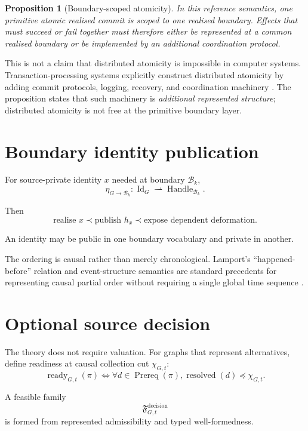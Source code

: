 \documentclass[11pt,a4paper]{article}
\newtheorem{proposition}[theorem]{Proposition}
\theoremstyle{remark}
\begin{document}
\begin{proposition}[Boundary-scoped atomicity]\label{prop:boundary-atomicity}
In this reference semantics, one primitive atomic realised commit is scoped to one realised boundary. Effects that must succeed or fail together must therefore either be represented at a common realised boundary or be implemented by an additional coordination protocol.
\end{proposition}

This is not a claim that distributed atomicity is impossible in computer systems. Transaction-processing systems explicitly construct distributed atomicity by adding commit protocols, logging, recovery, and coordination machinery \citep{gray1993}. The proposition states that such machinery is \emph{additional represented structure}; distributed atomicity is not free at the primitive boundary layer.

\section{Boundary identity publication}\label{sec:publication}

For source-private identity $x$ needed at boundary $\mathcal B_k$,
\[
\eta_{G\rightarrow\mathcal B_k}:
\operatorname{Id}_G
\rightharpoonup
\operatorname{Handle}_{\mathcal B_k}.
\]

Then
\[
\text{realise }x
\prec
\text{publish }h_x
\prec
\text{expose dependent deformation}.
\]

An identity may be public in one boundary vocabulary and private in another.

The ordering is causal rather than merely chronological. Lamport's ``happened-before'' relation and event-structure semantics are standard precedents for representing causal partial order without requiring a single global time sequence \citep{lamport1978,winskel1987}.

\section{Optional source decision}\label{sec:decision}

The theory does not require valuation. For graphs that represent alternatives, define readiness at causal collection cut $\chi_{G,t}$:
\[
\operatorname{ready}_{G,t}(\pi)
\iff
\forall d\in\operatorname{Prereq}(\pi),
\operatorname{resolved}(d)\preceq\chi_{G,t}.
\]

A feasible family
\[
\mathfrak F_{G,t}^{\mathrm{decision}}
\]
is formed from represented admissibility and typed well-formedness.
\end{document}
